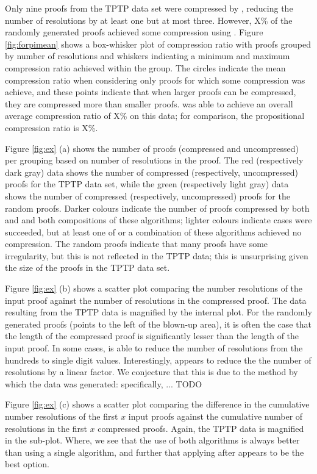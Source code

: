 {Only nine proofs from the TPTP data set were compressed by {\FORPI}, reducing the number of resolutions by at least one but at most three. However, X\% of the randomly generated proofs achieved some compression using {\FORPI}.
Figure \ref{fig:forpimean} shows a box-whisker plot of compression ratio with proofs grouped by number of resolutions and whiskers indicating a minimum and maximum compression ratio achieved within the group. The circles indicate the mean compression ratio when considering only proofs for which some compression was achieve, and these points indicate that when larger proofs can be compressed, they are compressed more than smaller proofs.
{\FORPI} was able to achieve an overall average compression ratio of X\% on this data; for comparison, the propositional {\RPI} compression ratio is X\%.

Figure \ref{fig:ex} (a) shows the number of proofs (compressed and uncompressed) per grouping based on number of resolutions in the proof. The red (respectively dark gray) data shows the number of compressed (respectively, uncompressed) proofs for the TPTP data set, while the green (respectively light gray) data shows the number of compressed (respectively, uncompressed) proofs for the random proofs. Darker colours indicate the number of proofs compressed by both {\FORPI} and {\GFOLU} and both compositions of these algorithms; lighter colours indicate cases were {\FORPI} succeeded, but at least one of {\GFOLU} or a combination of these algorithms achieved no compression. The random proofs indicate that many proofs have some irregularity, but this is not reflected in the TPTP data; this is unsurprising given the size of the proofs in the TPTP data set.

Figure \ref{fig:ex} (b) shows a scatter plot comparing the number resolutions of the input proof against the number of resolutions in the compressed proof. The data resulting from the TPTP data is magnified by the internal plot. For the randomly generated proofs (points to the left of the blown-up area), it is often the case that the length of the compressed proof is significantly lesser than the length of the input proof. In some cases, {\FORPI} is able to reduce the number of resolutions from the hundreds to single digit values. Interestingly, {\GFOLU} appears to reduce the the number of resolutions by a linear factor. We conjecture that this is due to the method by which the data was generated: specifically, ... TODO

Figure \ref{fig:ex} (c) shows a scatter plot comparing the difference in the cumulative number resolutions of the first $x$ input proofs against the cumulative number of resolutions in the first $x$ compressed proofs. Again, the TPTP data is magnified in the sub-plot. Where, we see that the use of both algorithms is always better than using a single algorithm, and further that applying {\FORPI} after {\GFOLU} appears to be the best option.

}
